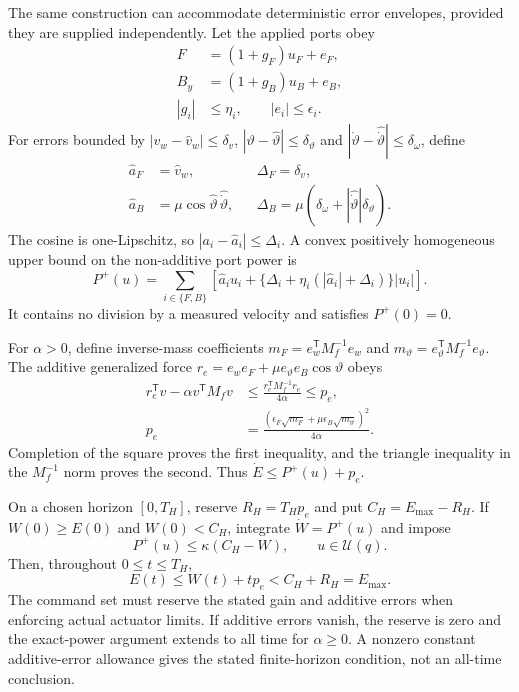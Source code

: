 The same construction can accommodate deterministic error envelopes,
provided they are supplied independently. Let the applied ports obey
\begin{align}
 F&=(1+g_F)u_F+e_F,\nonumber\\
 B_y&=(1+g_B)u_B+e_B,\nonumber\\
 |g_i|&\le\eta_i,\qquad |e_i|\le\epsilon_i.
 \label{sm:port-errors}
\end{align}
For errors bounded by
$|v_w-\widehat v_w|\le\delta_v$,
$|\vartheta-\widehat\vartheta|\le\delta_\vartheta$ and
$|\dot\vartheta-\widehat{\dot\vartheta}|\le\delta_\omega$, define
\begin{align}
 \widehat a_F&=\widehat v_w,\qquad &&\Delta_F=\delta_v,\nonumber\\
 \widehat a_B&=\mu\cos\widehat\vartheta\,\widehat{\dot\vartheta},
 &&\Delta_B=\mu(\delta_\omega+
                   |\widehat{\dot\vartheta}|\delta_\vartheta).
 \label{sm:power-estimation}
\end{align}
The cosine is one-Lipschitz, so $|a_i-\widehat a_i|\le\Delta_i$.
A convex positively homogeneous upper bound on the non-additive port
power is
\begin{equation}
 P^+(u)=\sum_{i\in\{F,B\}}
 \left[\widehat a_i u_i+
   \{\Delta_i+\eta_i(|\widehat a_i|+\Delta_i)\}|u_i|\right].
 \label{sm:power-envelope}
\end{equation}
It contains no division by a measured velocity and satisfies
$P^+(0)=0$.

For $\alpha>0$, define inverse-mass coefficients
$m_F=e_w^{\mathsf T}M_f^{-1}e_w$ and
$m_\vartheta=e_\vartheta^{\mathsf T}M_f^{-1}e_\vartheta$.
The additive generalized force
$r_e=e_we_F+\mu e_\vartheta e_B\cos\vartheta$ obeys
\begin{align}
 r_e^{\mathsf T}v-\alpha v^{\mathsf T}M_fv
 &\le\frac{r_e^{\mathsf T}M_f^{-1}r_e}{4\alpha}\le p_e,\nonumber\\
 p_e&=\frac{(\epsilon_F\sqrt{m_F}
                  +\mu\epsilon_B\sqrt{m_\vartheta})^2}{4\alpha}.
 \label{sm:additive-power}
\end{align}
Completion of the square proves the first inequality, and the triangle
inequality in the $M_f^{-1}$ norm proves the second.
Thus $\dot E\le P^+(u)+p_e$.

On a chosen horizon $[0,T_H]$, reserve $R_H=T_Hp_e$ and put
$C_H=E_{\max}-R_H$. If $W(0)\ge E(0)$ and
$W(0)<C_H$, integrate $\dot W=P^+(u)$ and impose
\begin{equation}
 P^+(u)\le\kappa(C_H-W),\qquad u\in\mathcal U(q).
 \label{sm:robust-governor}
\end{equation}
Then, throughout $0\le t\le T_H$,
\begin{equation}
 E(t)\le W(t)+tp_e<C_H+R_H=E_{\max}.
 \label{sm:robust-energy}
\end{equation}
The command set must reserve the stated gain and additive errors when
enforcing actual actuator limits. If additive errors vanish, the
reserve is zero and the exact-power argument extends to all time for
$\alpha\ge0$. A nonzero constant additive-error allowance gives the
stated finite-horizon condition, not an all-time conclusion.

